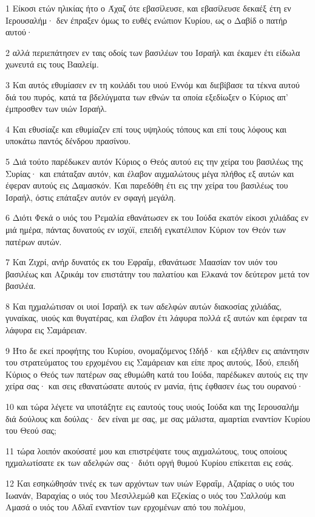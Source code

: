 \par 1 Είκοσι ετών ηλικίας ήτο ο Άχαζ ότε εβασίλευσε, και εβασίλευσε δεκαέξ έτη εν Ιερουσαλήμ· δεν έπραξεν όμως το ευθές ενώπιον Κυρίου, ως ο Δαβίδ ο πατήρ αυτού·
\par 2 αλλά περιεπάτησεν εν ταις οδοίς των βασιλέων του Ισραήλ και έκαμεν έτι είδωλα χωνευτά εις τους Βααλείμ.
\par 3 Και αυτός εθυμίασεν εν τη κοιλάδι του υιού Εννόμ και διεβίβασε τα τέκνα αυτού διά του πυρός, κατά τα βδελύγματα των εθνών τα οποία εξεδίωξεν ο Κύριος απ' έμπροσθεν των υιών Ισραήλ.
\par 4 Και εθυσίαζε και εθυμίαζεν επί τους υψηλούς τόπους και επί τους λόφους και υποκάτω παντός δένδρου πρασίνου.
\par 5 Διά τούτο παρέδωκεν αυτόν Κύριος ο Θεός αυτού εις την χείρα του βασιλέως της Συρίας· και επάταξαν αυτόν, και έλαβον αιχμαλώτους μέγα πλήθος εξ αυτών και έφεραν αυτούς εις Δαμασκόν. Και παρεδόθη έτι εις την χείρα του βασιλέως του Ισραήλ, όστις επάταξεν αυτόν εν σφαγή μεγάλη.
\par 6 Διότι Φεκά ο υιός του Ρεμαλία εθανάτωσεν εκ του Ιούδα εκατόν είκοσι χιλιάδας εν μιά ημέρα, πάντας δυνατούς εν ισχύϊ, επειδή εγκατέλιπον Κύριον τον Θεόν των πατέρων αυτών.
\par 7 Και Ζιχρί, ανήρ δυνατός εκ του Εφραΐμ, εθανάτωσε Μαασίαν τον υιόν του βασιλέως και Αζρικάμ τον επιστάτην του παλατίου και Ελκανά τον δεύτερον μετά τον βασιλέα.
\par 8 Και ηχμαλώτισαν οι υιοί Ισραήλ εκ των αδελφών αυτών διακοσίας χιλιάδας, γυναίκας, υιούς και θυγατέρας, και έλαβον έτι λάφυρα πολλά εξ αυτών και έφεραν τα λάφυρα εις Σαμάρειαν.
\par 9 Ήτο δε εκεί προφήτης του Κυρίου, ονομαζόμενος Ωδήδ· και εξήλθεν εις απάντησιν του στρατεύματος του ερχομένου εις Σαμάρειαν και είπε προς αυτούς, Ιδού, επειδή Κύριος ο Θεός των πατέρων σας εθυμώθη κατά του Ιούδα, παρέδωκεν αυτούς εις την χείρα σας· και σεις εθανατώσατε αυτούς εν μανία, ήτις έφθασεν έως του ουρανού·
\par 10 και τώρα λέγετε να υποτάξητε εις εαυτούς τους υιούς Ιούδα και της Ιερουσαλήμ διά δούλους και δούλας· δεν είναι με σας, με σας μάλιστα, αμαρτίαι εναντίον Κυρίου του Θεού σας;
\par 11 τώρα λοιπόν ακούσατέ μου και επιστρέψατε τους αιχμαλώτους, τους οποίους ηχμαλωτίσατε εκ των αδελφών σας· διότι οργή θυμού Κυρίου επίκειται εις εσάς.
\par 12 Και εσηκώθησάν τινές εκ των αρχόντων των υιών Εφραΐμ, Αζαρίας ο υιός του Ιωανάν, Βαραχίας ο υιός του Μεσιλλεμώθ και Εζεκίας ο υιός του Σαλλούμ και Αμασά ο υιός του Αδλαΐ εναντίον των ερχομένων από του πολέμου,
